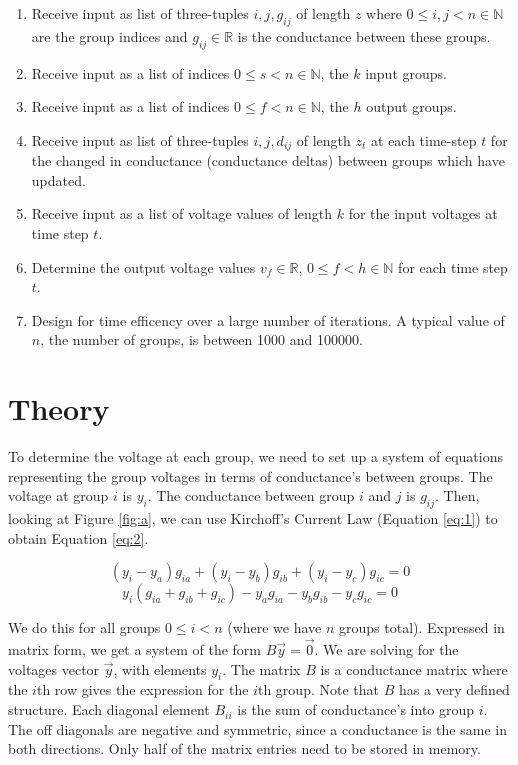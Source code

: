 \documentclass[11pt]{article}
\begin{document}
\begin{enumerate}
    \item Receive input as list of three-tuples $i, j, g_{ij}$ of length $z$ where $0 \le i,j < n \in \mathbb{N}$ are the group indices and $g_{ij} \in \mathbb{R}$ is the conductance between these groups.
    \item Receive input as a list of indices $0\le s < n \in \mathbb{N}$, the $k$ input groups.
    \item Receive input as a list of indices $0\le f < n \in \mathbb{N}$, the $h$ output groups.
    \item Receive input as list of three-tuples $i, j, d_{ij}$ of length $z_t$ at each time-step $t$ for the changed in conductance (conductance deltas) between groups which have updated.
    \item Receive input as a list of voltage values of length $k$ for the input voltages at time step $t$.
    \item Determine the output voltage values $v_f \in \mathbb{R}$, $0 \le f < h \in \mathbb{N}$ for each time step $t$.
    \item Design for time efficency over a large number of iterations. A typical value of $n$, the number of groups, is between \num{1000} and \num{100000}.
\end{enumerate}

\section{Theory}
 To determine the voltage at each group, we need to set up a system of equations representing the group voltages in terms of conductance's between groups. The voltage at group $i$ is $y_i$. The conductance between group $i$ and $j$ is $g_{ij}$. Then, looking at Figure \ref{fig:a}, we can use Kirchoff's Current Law (Equation \ref{eq:1}) to obtain Equation \ref{eq:2}.

\begin{equation}\label{eq:1}
    (y_i-y_a) g_{ia} + (y_i-y_b) g_{ib} + (y_i-y_c) g_{ic} = 0
\end{equation}
\begin{equation}\label{eq:2}
    y_i (g_{ia} + g_{ib} + g_{ic}) - y_a g_{ia} - y_b g_{ib} - y_c g_{ic} = 0
\end{equation}

We do this for all groups $0 \le i < n$ (where we have $n$ groups total). Expressed in matrix form, we get a system of the form $B\vec y=\vec 0$. We are solving for the voltages vector $\vec y$, with elements $y_i$. The matrix $B$ is a conductance matrix where the $i$th row gives the expression for the $i$th group. Note that $B$ has a very defined structure. Each diagonal element $B_{ii}$ is the sum of conductance's into group $i$. The off diagonals are negative and symmetric, since a conductance is the same in both directions. Only half of the matrix entries need to be stored in memory.
\end{document}
